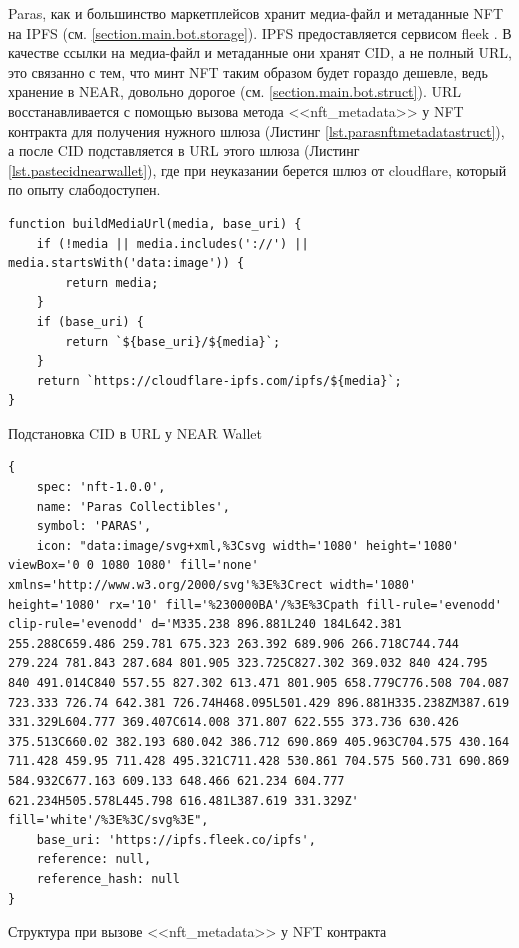 Paras, как и большинство маркетплейсов хранит медиа-файл и метаданные NFT на IPFS \cite{ipfs} (см. {\color{blue} \ref{section.main.bot.storage}}). IPFS предоставляется сервисом fleek \cite{fleek}. В качестве ссылки на медиа-файл и метаданные они хранят CID, а не полный URL, это связанно с тем, что минт NFT таким образом будет гораздо дешевле, ведь хранение в NEAR, довольно дорогое (см. {\color{blue} \ref{section.main.bot.struct}}). URL восстанавливается с помощью вызова метода <<nft\_metadata>> у NFT контракта для получения нужного шлюза (Листинг {\color{blue}\ref{lst.parasnftmetadatastruct}}), а после CID подставляется в URL этого шлюза (Листинг {\color{blue}\ref{lst.pastecidnearwallet}}), где при неуказании берется шлюз от cloudflare, который по опыту слабодоступен.

\begin{listing}
\begin{verbatim}
function buildMediaUrl(media, base_uri) {
    if (!media || media.includes('://') || media.startsWith('data:image')) {
        return media;
    }
    if (base_uri) {
        return `${base_uri}/${media}`;
    }
    return `https://cloudflare-ipfs.com/ipfs/${media}`;
}
\end{verbatim}
\caption{Подстановка CID в URL у NEAR Wallet \cite{pastecidnearwallet}}
\label{lst.pastecidnearwallet}
\end{listing}

\begin{listing}
\begin{verbatim}
{
    spec: 'nft-1.0.0',
    name: 'Paras Collectibles',
    symbol: 'PARAS',
    icon: "data:image/svg+xml,%3Csvg width='1080' height='1080' viewBox='0 0 1080 1080' fill='none' xmlns='http://www.w3.org/2000/svg'%3E%3Crect width='1080' height='1080' rx='10' fill='%230000BA'/%3E%3Cpath fill-rule='evenodd' clip-rule='evenodd' d='M335.238 896.881L240 184L642.381 255.288C659.486 259.781 675.323 263.392 689.906 266.718C744.744 279.224 781.843 287.684 801.905 323.725C827.302 369.032 840 424.795 840 491.014C840 557.55 827.302 613.471 801.905 658.779C776.508 704.087 723.333 726.74 642.381 726.74H468.095L501.429 896.881H335.238ZM387.619 331.329L604.777 369.407C614.008 371.807 622.555 373.736 630.426 375.513C660.02 382.193 680.042 386.712 690.869 405.963C704.575 430.164 711.428 459.95 711.428 495.321C711.428 530.861 704.575 560.731 690.869 584.932C677.163 609.133 648.466 621.234 604.777 621.234H505.578L445.798 616.481L387.619 331.329Z' fill='white'/%3E%3C/svg%3E",
    base_uri: 'https://ipfs.fleek.co/ipfs',
    reference: null,
    reference_hash: null
}
\end{verbatim}
\caption{Структура при вызове <<nft\_metadata>> у NFT контракта}
\label{lst.parasfunctioncallnftmetadata}
\end{listing}


